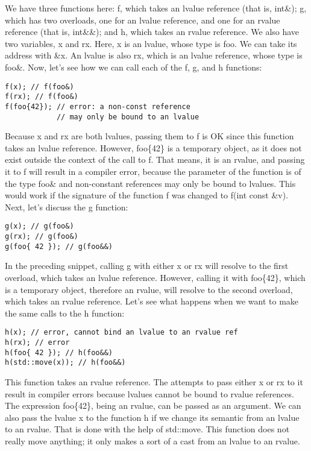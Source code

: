 We have three functions here: f, which takes an lvalue reference (that is, int\&); g, which has two overloads, one for an lvalue reference, and one for an rvalue reference (that is, int\&\&); and h, which takes an rvalue reference. We also have two variables, x and rx. Here, x is an lvalue, whose type is foo. We can take its address with \&x. An lvalue is also rx, which is an lvalue reference, whose type is foo\&. Now, let’s see how we can call each of the f, g, and h functions:

\begin{lstlisting}[style=styleCXX]
f(x); // f(foo&)
f(rx); // f(foo&)
f(foo{42}); // error: a non-const reference
            // may only be bound to an lvalue
\end{lstlisting}

Because x and rx are both lvalues, passing them to f is OK since this function takes an lvalue reference. However, foo\{42\} is a temporary object, as it does not exist outside the context of the call to f. That means, it is an rvalue, and passing it to f will result in a compiler error, because the parameter of the function is of the type foo\& and non-constant references may only be bound to lvalues. This would work if the signature of the function f was changed to f(int const \&v). Next, let’s discuss the g function:

\begin{lstlisting}[style=styleCXX]
g(x); // g(foo&)
g(rx); // g(foo&)
g(foo{ 42 }); // g(foo&&)
\end{lstlisting}

In the preceding snippet, calling g with either x or rx will resolve to the first overload, which takes an lvalue reference. However, calling it with foo\{42\}, which is a temporary object, therefore an rvalue, will resolve to the second overload, which takes an rvalue reference. Let’s see what happens when we want to make the same calls to the h function:

\begin{lstlisting}[style=styleCXX]
h(x); // error, cannot bind an lvalue to an rvalue ref
h(rx); // error
h(foo{ 42 }); // h(foo&&)
h(std::move(x)); // h(foo&&)
\end{lstlisting}

This function takes an rvalue reference. The attempts to pass either x or rx to it result in compiler errors because lvalues cannot be bound to rvalue references. The expression foo\{42\}, being an rvalue, can be passed as an argument. We can also pass the lvalue x to the function h if we change its semantic from an lvalue to an rvalue. That is done with the help of std::move. This function does not really move anything; it only makes a sort of a cast from an lvalue to an rvalue.

